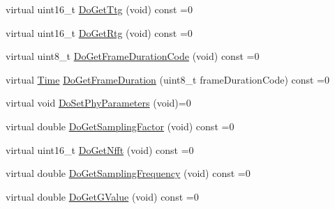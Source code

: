 \begin{DoxyCompactItemize}
\item 
virtual uint16\+\_\+t \hyperlink{classns3_1_1WimaxPhy_a43b1472926c34cab614175f857b10efd}{Do\+Get\+Ttg} (void) const =0
\item 
virtual uint16\+\_\+t \hyperlink{classns3_1_1WimaxPhy_a8ab5b2de44a9298473e7a9698d77eef7}{Do\+Get\+Rtg} (void) const =0
\item 
virtual uint8\+\_\+t \hyperlink{classns3_1_1WimaxPhy_ac9a73fcd0b75aa8e4061ba4738818c54}{Do\+Get\+Frame\+Duration\+Code} (void) const =0
\item 
virtual \hyperlink{classns3_1_1Time}{Time} \hyperlink{classns3_1_1WimaxPhy_aa45fdd1a93ebf5ba64ff44e1f40ef6a4}{Do\+Get\+Frame\+Duration} (uint8\+\_\+t frame\+Duration\+Code) const =0
\item 
virtual void \hyperlink{classns3_1_1WimaxPhy_aa57c0245723a505c72b9b4336e3bcfe1}{Do\+Set\+Phy\+Parameters} (void)=0
\item 
virtual double \hyperlink{classns3_1_1WimaxPhy_a919ad33ecebb052d8794596c2de72376}{Do\+Get\+Sampling\+Factor} (void) const =0
\item 
virtual uint16\+\_\+t \hyperlink{classns3_1_1WimaxPhy_aca4ffc548b60bd0561aef6b0c808e61c}{Do\+Get\+Nfft} (void) const =0
\item 
virtual double \hyperlink{classns3_1_1WimaxPhy_a9d45cfe54da2cc741c8031bcf47c3d93}{Do\+Get\+Sampling\+Frequency} (void) const =0
\item 
virtual double \hyperlink{classns3_1_1WimaxPhy_ae9777e19be5f7b7ed257aac4e8df83fe}{Do\+Get\+G\+Value} (void) const =0
\end{DoxyCompactItemize}

